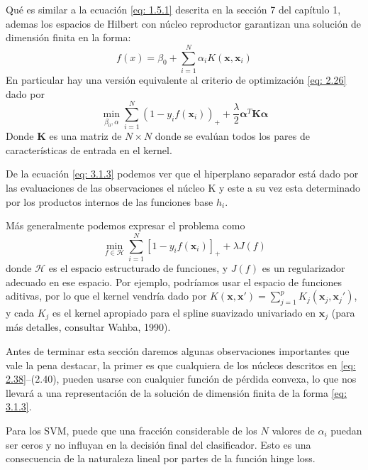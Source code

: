 \documentclass[letterpaper,12pt,oneside]{book}
\begin{document}
{{{{    Qué es similar a la ecuación \eqref{eq: 1.5.1} descrita  en la sección 7 del capítulo 1, ademas los espacios de Hilbert con núcleo reproductor garantizan una solución de dimensión finita en la forma:
    \begin{equation}
        f(x) =\beta_0 + \sum_{i=1}^{N} \alpha_i K(\mathbf{x}, \mathbf{x}_i) \label{eq: 3.1.3}
    \end{equation}
    En particular hay una versión equivalente al criterio de optimización \eqref{eq: 2.26} dado por 
    \begin{equation}
        \min_{\beta_0, \alpha} \sum_{i=1}^{N} \left(1 - y_i f(\mathbf{x}_i)\right)_{+} + \frac{\lambda}{2} \boldsymbol{\alpha}^T \mathbf{K} \boldsymbol{\alpha}
    \end{equation}
Donde $\mathbf{K}$ es una matriz de $N \times N$ donde se evalúan todos los pares de características de entrada en el kernel.  

De la ecuación \eqref{eq: 3.1.3} podemos ver que el hiperplano separador está dado por las evaluaciones de las observaciones el núcleo K y este a su vez esta determinado por los productos internos de las funciones base $h_i$.

   
   Más generalmente podemos expresar el problema como 
   \begin{equation}
       \min_{f \in \mathcal{H}} \sum_{i=1}^{N} \left[1 - y_i f(\mathbf{x}_i)\right]_{+} + \lambda J(f)
   \end{equation}
donde $\mathcal{H}$ es el espacio estructurado de funciones, y $J(f)$ es un regularizador adecuado en ese espacio. Por ejemplo, podríamos usar el espacio de funciones aditivas, por lo que el kernel vendría dado por $K(\mathbf{x}, \mathbf{x}') = \sum_{j=1}^{p} K_j(\mathbf{x}_j, \mathbf{x}_j')$, y cada \(K_j\) es el kernel apropiado para el spline suavizado univariado en \(\mathbf{x}_j\) (para más detalles, consultar Wahba, 1990). 

Antes de terminar esta sección daremos algunas observaciones importantes que vale la pena  destacar, la primer es que cualquiera de los núcleos descritos en \eqref{eq: 2.38}--(2.40), pueden usarse con cualquier función de pérdida convexa, lo que nos llevará a una representación de la solución de dimensión finita de la forma \eqref{eq: 3.1.3}.

Para los SVM, puede que una fracción considerable de los \(N\) valores de \(\alpha_i\) puedan ser ceros y no influyan en la decisión final del clasificador. Esto es una consecuencia de la naturaleza lineal por partes de la función hinge loss. 

}}}}
\end{document}
